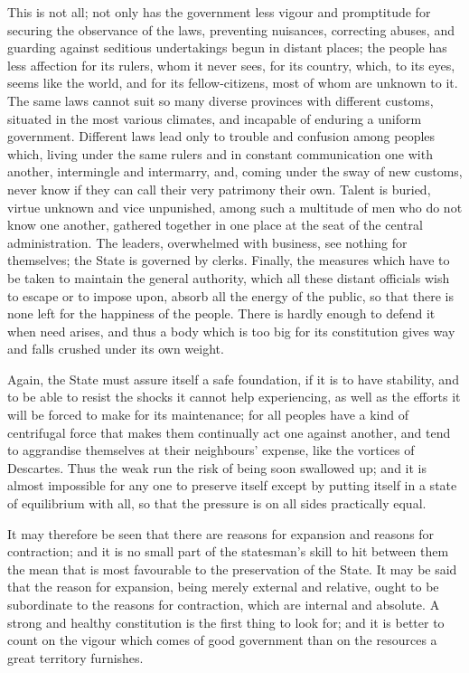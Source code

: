 \documentclass[12pt]{report}
\begin{document}
This is not all; not only has the government less vigour and promptitude for securing the observance of the laws, preventing nuisances, correcting abuses, and guarding against seditious undertakings begun in distant places; the people has less affection for its rulers, whom it never sees, for its country, which, to its eyes, seems like the world, and for its fellow-citizens, most of whom are unknown to it. The same laws cannot suit so many diverse provinces with different customs, situated in the most various climates, and incapable of enduring a uniform government. Different laws lead only to trouble and confusion among peoples which, living under the same rulers and in constant communication one with another, intermingle and intermarry, and, coming under the sway of new customs, never know if they can call their very patrimony their own. Talent is buried, virtue unknown and vice unpunished, among such a multitude of men who do not know one another, gathered together in one place at the seat of the central administration. The leaders, overwhelmed with business, see nothing for themselves; the State is governed by clerks. Finally, the measures which have to be taken to maintain the general authority, which all these distant officials wish to escape or to impose upon, absorb all the energy of the public, so that there is none left for the happiness of the people. There is hardly enough to defend it when need arises, and thus a body which is too big for its constitution gives way and falls crushed under its own weight.

Again, the State must assure itself a safe foundation, if it is to have stability, and to be able to resist the shocks it cannot help experiencing, as well as the efforts it will be forced to make for its maintenance; for all peoples have a kind of centrifugal force that makes them continually act one against another, and tend to aggrandise themselves at their neighbours' expense, like the vortices of Descartes. Thus the weak run the risk of being soon swallowed up; and it is almost impossible for any one to preserve itself except by putting itself in a state of equilibrium with all, so that the pressure is on all sides practically equal.

It may therefore be seen that there are reasons for expansion and reasons for contraction; and it is no small part of the statesman's skill to hit between them the mean that is most favourable to the preservation of the State. It may be said that the reason for expansion, being merely external and relative, ought to be subordinate to the reasons for contraction, which are internal and absolute. A strong and healthy constitution is the first thing to look for; and it is better to count on the vigour which comes of good government than on the resources a great territory furnishes.
\end{document}
